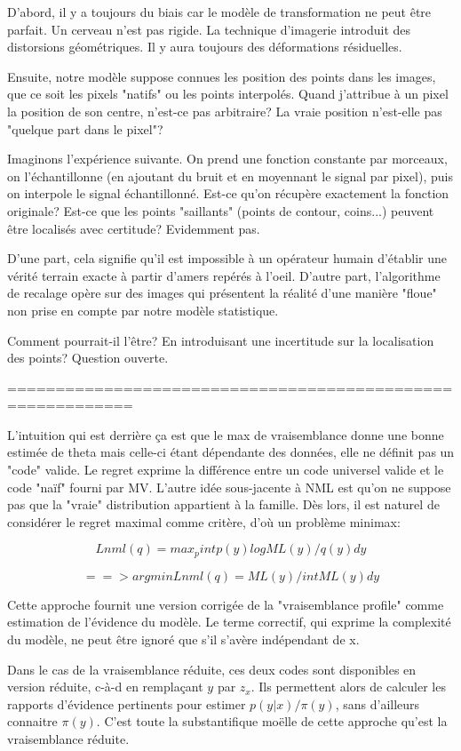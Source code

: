 \documentclass{article}
\begin{document}
D'abord, il y a toujours du biais car le mod\`ele de transformation ne peut \^etre parfait. Un cerveau n'est pas rigide. La technique d'imagerie introduit des distorsions g\'eom\'etriques. Il y aura toujours des d\'eformations r\'esiduelles. 

Ensuite, notre mod\`ele suppose connues les position des points dans les images, que ce soit les pixels "natifs" ou les points interpol\'es. Quand j'attribue \`a un pixel la position de son centre, n'est-ce pas arbitraire? La vraie position n'est-elle pas "quelque part dans le pixel"? 

Imaginons l'exp\'erience suivante. On prend une fonction constante par morceaux, on l'\'echantillonne (en ajoutant du bruit et en moyennant le signal par pixel), puis on interpole le signal \'echantillonn\'e. Est-ce qu'on r\'ecup\`ere exactement la fonction originale? Est-ce que les points "saillants" (points de contour, coins...) peuvent \^etre localis\'es avec certitude? Evidemment pas. 

D'une part, cela signifie qu'il est impossible \`a un op\'erateur humain d'\'etablir une v\'erit\'e terrain exacte \`a partir d'amers rep\'er\'es \`a l'oeil. D'autre part, l'algorithme de recalage op\`ere sur des images qui pr\'esentent la r\'ealit\'e d'une mani\`ere "floue" non prise en compte par notre mod\`ele statistique. 

Comment pourrait-il l'\^etre? En introduisant une incertitude sur la localisation des points? Question ouverte.  







=========================================================== 

L'intuition qui est derri\`ere \c{c}a est que le max de vraisemblance donne une bonne estim\'ee de theta mais celle-ci \'etant d\'ependante des donn\'ees, elle ne d\'efinit pas un "code" valide. Le regret exprime la diff\'erence entre un code universel valide et le code "na\"if" fourni par MV. L'autre id\'ee sous-jacente \`a NML est qu'on ne suppose pas que la "vraie" distribution appartient \`a la famille. D\`es lors, il est naturel de consid\'erer le regret maximal comme crit\`ere, d'o\`u un probl\`eme minimax: 

$$Lnml(q) = max_p int p(y) log ML(y)/q(y) dy$$ 

$$==> argmin Lnml(q) = ML(y) / int ML(y) dy$$ 

Cette approche fournit une version corrig\'ee de la "vraisemblance profile" comme estimation de l'\'evidence du mod\`ele. Le terme correctif, qui exprime la complexit\'e du mod\`ele, ne peut \^etre ignor\'e que s'il s'av\`ere ind\'ependant de x. 

Dans le cas de la vraisemblance r\'eduite, ces deux codes sont disponibles en version r\'eduite, c-\`a-d en rempla\c{c}ant $y$ par $z_x$. Ils permettent alors de calculer les rapports d'\'evidence pertinents pour estimer $p(y|x)/\pi(y)$, sans d'ailleurs connaitre $\pi(y)$. C'est toute la substantifique mo\"elle de cette approche qu'est la vraisemblance r\'eduite. 
\end{document}
